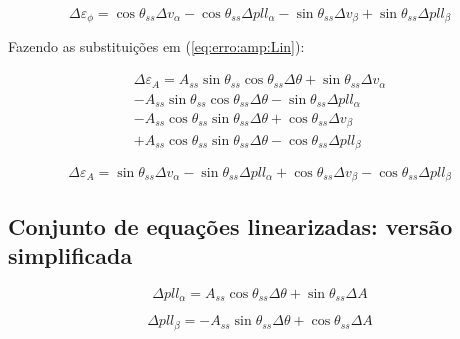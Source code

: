 \documentclass[12pt,a4paper]{report}
\begin{document}
\begin{equation}
\Delta \varepsilon_\phi = 
 \cos \theta_{ss} \Delta v_{\alpha} 
- \cos \theta_{ss}  \Delta pll_\alpha 
- \sin \theta_{ss} \Delta v_\beta 
+ \sin \theta_{ss}  \Delta pll_\beta
\label{eq:erro:phi:Lin:2}
\end{equation}





Fazendo as substituições em (\ref{eq:erro:amp:Lin}):


\begin{multline}
\Delta\varepsilon_A =
A_{ss} \sin \theta_{ss} \cos \theta_{ss} \Delta \theta 
+ \sin \theta_{ss}  \Delta v_\alpha \\
- A_{ss} \sin \theta_{ss} \cos \theta_{ss} \Delta \theta
- \sin \theta_{ss} \Delta pll_\alpha \\
- A_{ss} \cos \theta_{ss} \sin \theta_{ss}  \Delta \theta
+ \cos \theta_{ss} \Delta v_\beta \\
+ A_{ss} \cos \theta_{ss} \sin \theta_{ss}  \Delta \theta
- \cos \theta_{ss} \Delta pll_\beta
\end{multline}


\begin{equation}
\Delta\varepsilon_A =
\sin \theta_{ss}  \Delta v_\alpha 
- \sin \theta_{ss} \Delta pll_\alpha 
+ \cos \theta_{ss} \Delta v_\beta 
- \cos \theta_{ss} \Delta pll_\beta
\label{eq:erro:amp:Lin:2}
\end{equation}










\subsection{Conjunto de equações linearizadas: versão simplificada}

\begin{equation}
\Delta pll_{\alpha} = 
A_{ss} \cos \theta_{ss} \Delta \theta +
\sin \theta_{ss} \Delta A
\end{equation}



\begin{equation}
\Delta pll_{\beta} = 
- A_{ss} \sin \theta_{ss} \Delta \theta +
\cos \theta_{ss} \Delta A
\end{equation}
\end{document}
